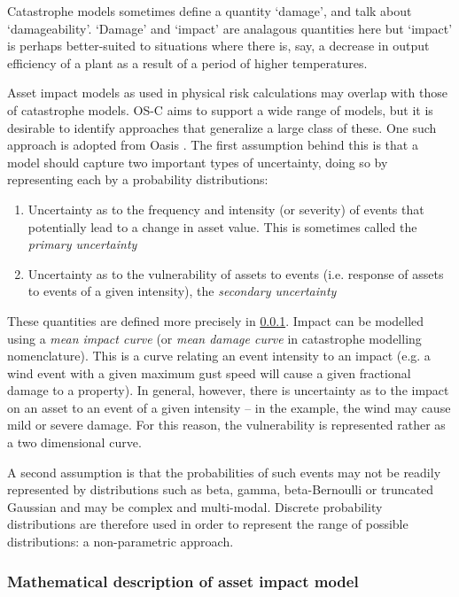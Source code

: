 \documentclass[a4paper,11pt]{extarticle} %
\begin{document}
Catastrophe models sometimes define a quantity `damage', and talk about `damageability'. `Damage' and `impact' are analagous quantities here but `impact' is perhaps better-suited to situations where there is, say, a decrease in output efficiency of a plant as a result of a period of higher temperatures.

Asset impact models as used in physical risk calculations may overlap with those of catastrophe models. OS-C aims to support a wide range of models, but it is desirable to identify approaches that generalize a large class of these. One such approach is adopted from Oasis \cite{OasisLMF}. The first assumption behind this is that a model should capture two important types of uncertainty, doing so by representing each by a probability distributions:
\begin{enumerate}
    \item Uncertainty as to the frequency and intensity (or severity) of events that potentially lead to a change in asset value. This is sometimes called the {\it primary uncertainty}
    \item Uncertainty as to the vulnerability of assets to events (i.e. response of assets to events of a given intensity), the {\it secondary uncertainty}
\end{enumerate}

These quantities are defined more precisely in \ref{Sec:MathematicalDescriptionOfAssetImpactModel}. Impact can be modelled using a {\it mean impact curve} (or {\it mean damage curve} in catastrophe modelling nomenclature). This is a curve relating an event intensity to an impact (e.g. a wind event with a given maximum gust speed will cause a given fractional damage to a property). In general, however, there is uncertainty as to the impact on an asset to an event of a given intensity -- in the example, the wind may cause mild or severe damage. For this reason, the vulnerability is represented rather as a two dimensional curve.

A second assumption is that the probabilities of such events may not be readily represented by distributions such as beta, gamma, beta-Bernoulli or truncated Gaussian and may be complex and multi-modal. Discrete probability distributions are therefore used in order to represent the range of possible distributions: a non-parametric approach.

\subsubsection{Mathematical description of asset impact model}
\label{Sec:MathematicalDescriptionOfAssetImpactModel}
\end{document}

